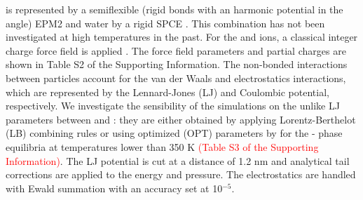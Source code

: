  is represented by a semiflexible (rigid bonds with an harmonic potential in the angle) EPM2 \cite{Harris1995} and water by a rigid SPCE \cite{Berendsen1987}. This combination has not been investigated at high temperatures in the past. For the  and  ions, a classical integer charge force field is applied \cite{Smith1994}. The force field parameters and partial charges are shown in Table S2 of the Supporting Information. The non-bonded interactions between particles account for the van der Waals and electrostatics interactions, which are represented by the Lennard-Jones (LJ) and Coulombic potential, respectively. We investigate the sensibility of the simulations on the unlike LJ parameters between  and : they are either obtained by applying Lorentz-Berthelot (LB) combining rules or using optimized (OPT) parameters by \citeauthor{Vlcek2011} \cite{Vlcek2011} for the - phase equilibria at temperatures lower than 350 K \textcolor{red}{(Table S3 of the Supporting Information)}. The LJ potential is cut at a distance of 1.2 nm and analytical tail corrections are applied to the energy and pressure. The electrostatics are handled with Ewald summation with an accuracy set at 10$^{-5}$.

